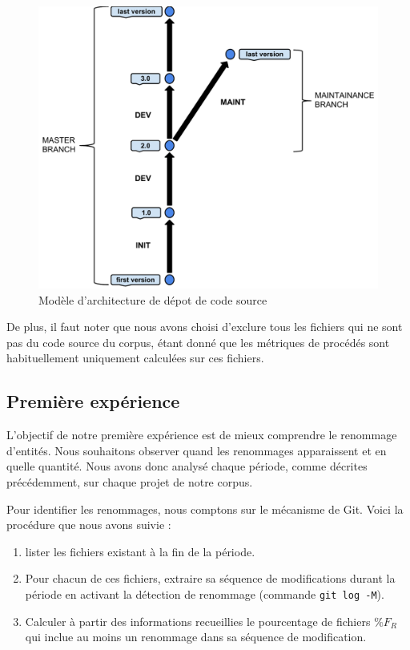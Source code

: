 \begin{figure}[h]
  \centering
  \includegraphics[scale=0.5]{data/figures/periods.pdf}
	\caption{Modèle d'architecture de dépot de code source}
	\label{fig:model}
\end{figure}

De plus, il faut noter que nous avons choisi d'exclure tous les fichiers qui ne sont pas du code source du corpus, étant donné que les métriques de procédés sont habituellement uniquement calculées sur ces fichiers. \\

\subsection{Première expérience}

 L'objectif de notre première expérience est de mieux comprendre le renommage d'entités. Nous souhaitons observer quand les renommages apparaissent et en quelle quantité. Nous avons donc analysé chaque période, comme décrites précédemment, sur chaque projet de notre corpus. 

Pour identifier les renommages, nous comptons sur le mécanisme de Git. Voici la procédure que nous avons suivie :
\begin{enumerate}
\item lister les fichiers existant à la fin de la période.
\item Pour chacun de ces fichiers, extraire sa séquence de modifications durant la période en activant la détection de renommage (commande \texttt{git log -M}).
\item Calculer à partir des informations recueillies le pourcentage de fichiers $\%F_{R}$ qui inclue au moins un renommage dans sa séquence de modification.
\end{enumerate}
\medskip

